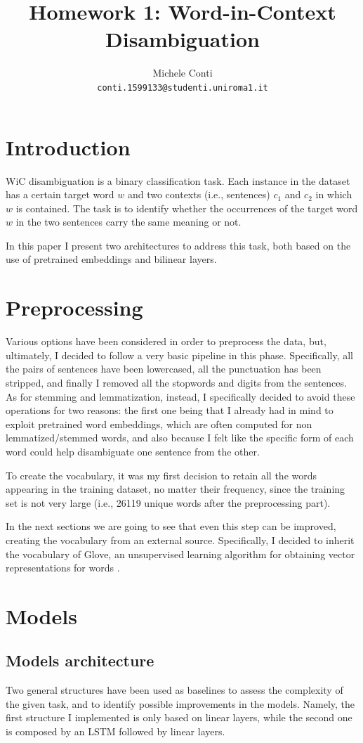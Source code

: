 \documentclass[11pt,a4paper]{article}
\title{Homework 1: Word-in-Context Disambiguation}
\author{Michele Conti \\
	\texttt{conti.1599133@studenti.uniroma1.it}\\}
\date{}
\begin{document}
	\maketitle
	\section{Introduction}
	WiC disambiguation is a binary classification task. Each instance in the dataset has a certain target word $w$ and two contexts (i.e., sentences) $c_1$ and $c_2$ in which $w$ is contained. The task is to identify whether the occurrences of the target word $w$ in the two sentences carry the same meaning or not.
	
	In this paper I present two architectures to address this task, both based on the use of pretrained embeddings and bilinear layers.

	\section{Preprocessing}	
	Various options have been considered in order to preprocess the data, but, ultimately, I decided to follow a very basic pipeline in this phase. Specifically, all the pairs of sentences have been lowercased, all the punctuation has been stripped, and finally I removed all the stopwords and digits from the sentences. As for stemming and lemmatization, instead, I specifically decided to avoid these operations for two reasons: the first one being that I already had in mind to exploit pretrained word embeddings, which are often computed for non lemmatized/stemmed words, and also because I felt like the specific form of each word could help disambiguate one sentence from the other.
	
	To create the vocabulary, it was my first decision to retain all the words appearing in the training dataset, no matter their frequency, since the training set is not very large (i.e., 26119 unique words after the preprocessing part).
	
	In the next sections we are going to see that even this step can be improved, creating the vocabulary from an external source. Specifically, I decided to inherit the vocabulary of Glove, an unsupervised learning algorithm for obtaining vector representations for words \citep{pennington2014glove}.

	\section{Models}
	\subsection{Models architecture}
	Two general structures have been used as baselines to assess the complexity of the given task, and to identify possible improvements in the models. Namely, the first structure I implemented is only based on linear layers, while the second one is composed by an LSTM followed by linear layers.
	
\end{document}

